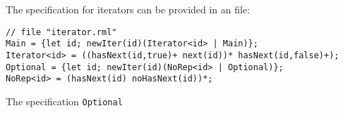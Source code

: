 The specification for iterators can be provided in an \RML file:
\begin{lstlisting}[basicstyle=\tt\footnotesize]
// file "iterator.rml"      
Main = {let id; newIter(id)(Iterator<id> | Main)};
Iterator<id> = ((hasNext(id,true)+ next(id))* hasNext(id,false)+);   
Optional = {let id; newIter(id)(NoRep<id> | Optional)};
NoRep<id> = (hasNext(id) noHasNext(id))*; 
\end{lstlisting}
The specification \lstinline|Optional|


